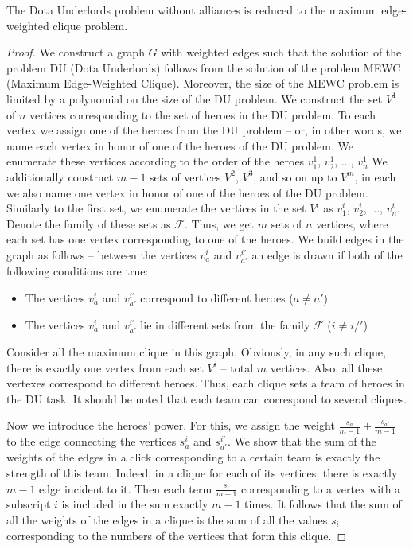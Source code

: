 \documentclass[smallextended]{svjour3}       %
\begin{document}
\begin{theorem}
\label{trivial_case}
    The Dota Underlords problem without alliances is reduced to the  maximum edge-weighted clique problem.
\end{theorem}
\begin{proof}
    
   We construct a graph $G$ with weighted edges such that the solution of the problem DU (Dota Underlords) follows from the solution of the problem MEWC (Maximum Edge-Weighted Clique). Moreover, the size of the MEWC problem is limited by a polynomial on the size of the DU problem.
    We construct the set $V^1 $ of $n$ vertices corresponding to the set of heroes in the DU problem. To each vertex we assign one of the heroes from the DU problem -- or, in other words, we name each vertex in honor of one of the heroes of the DU problem. We enumerate these vertices according to the order of the heroes $v_1^1$, $v_2^1$, ..., $ v_n^1$
    We additionally construct $m-1$ sets of vertices $ V^2 $, $ V^3 $, and so on up to $ V^m $, in each we also name one vertex in honor of one of the heroes of the DU problem. Similarly to the first set, we enumerate the vertices in the set $V^i $ as $ v_1^i $, $v_2^i$, ..., $v_n^i$.
    Denote the family of these sets as $ \mathcal{F} $. Thus, we get $m$ sets of $n$ vertices, where each set has one vertex corresponding to one of the heroes.
   We build edges in the graph as follows --  between the vertices $v_a^i $ and $v_{a'}^{i'} $ an edge is drawn if both of the following conditions are true:
    \begin{itemize}
        \item The vertices $v_a^i $ and $v_{a'}^{i'} $ correspond to different heroes ($a \neq a'$)
        \item The vertices $v_a^i $ and $v_{a'}^{i'} $ lie in different sets from the family $\mathcal{F}$ ($ i \neq i /'$)
    \end{itemize}

    Consider all the maximum clique in this graph. Obviously, in any such clique, there is exactly one vertex from each set $ V^i $ -- total $m$ vertices. Also, all these vertexes correspond to different heroes. Thus, each clique sets a team of heroes in the DU task. It should be noted that each team can correspond to several cliques.
  
    Now we introduce the heroes’ power. For this, we assign the weight $ \frac{s_a}{m-1} + \frac{s_{a '}}{m-1}$ to the edge connecting the vertices $s_a^i$ and $s_ {a'}^{i'}$. We show that the sum of the weights of the edges in a click corresponding to a certain team is exactly the strength of this team.
    Indeed, in a clique for each of its vertices, there is exactly $m-1$ edge incident to it. Then each term $\frac{s_i}{m-1}$ corresponding to a vertex with a subscript $i$ is included in the sum exactly $m-1$ times. It follows that the sum of all the weights of the edges in a clique is the sum of all the values $s_i$ corresponding to the numbers of the vertices that form this clique.      
\end{proof}
\end{document}
